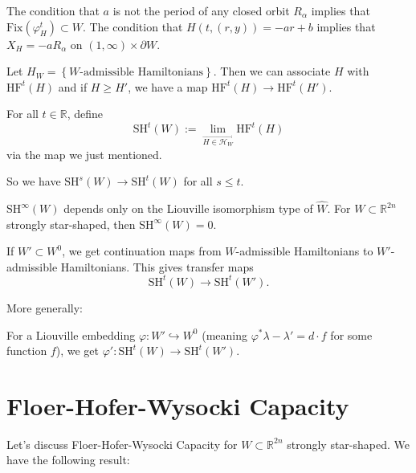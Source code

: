 The condition that $a$ is not the period of any closed orbit $R_\alpha$ implies that $\text{Fix}(\varphi_H^t)\subset W$. The condition that $H(t,(r,y)) = -ar+b$ implies that $X_H=-aR_\alpha$ on $(1,\infty)\times \partial W$.

Let $H_W=\left\{ W\text{-admissible Hamiltonians}\right\}$. Then we can associate $H$ with $\text{HF}^t(H)$ and if $H\ge H'$, we have a map $\text{HF}^{t}(H) \to \text{HF}^t(H')$.

\begin{definition}

For all $t\in \mathbb{R}$, define
\[
\text{SH}^t(W) := \lim_{\stackrel{\longrightarrow}{H\in \mathcal{H}_W}} \text{HF}^t(H)
\]
via the map we just mentioned.

\end{definition}

So we have $\text{SH}^s(W) \to \text{SH}^t(W)$ for all $s\le t$.

\begin{proposition}

$\text{SH}^\infty(W)$ depends only on the Liouville isomorphism type of $\hat{W}$. For $W\subset \mathbb{R}^{2n}$ strongly star-shaped, then $\text{SH}^\infty(W)=0$.

\end{proposition}

\begin{proposition}

If $W'\subset W^0$, we get continuation maps from $W$-admissible Hamiltonians to $W'$-admissible Hamiltonians. This gives transfer maps
\[
\text{SH}^t(W) \to \text{SH}^t(W').
\]

\end{proposition}

More generally:

\begin{proposition}

For a Liouville embedding $\varphi: W' \hookrightarrow W^0$ (meaning $\varphi^*\lambda - \lambda' = d\cdot f$ for some function $f$), we get $\varphi': \text{SH}^t(W)\to \text{SH}^t(W')$.

\end{proposition}

\section{Floer-Hofer-Wysocki Capacity}

Let's discuss Floer-Hofer-Wysocki Capacity for $W\subset \mathbb{R}^{2n}$ strongly star-shaped. We have the following result:

